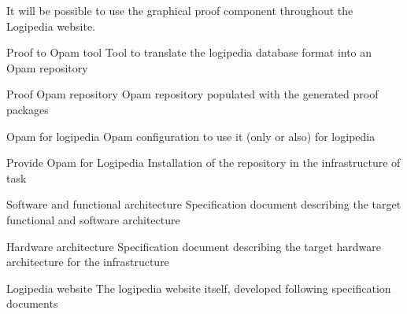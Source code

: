\begin{workpackage}[id=access,wphases=0-48,type=MGT,
  short=Access,%
  title={Access to the infrastructure},
  lead=Irt,IrtRM=23,OcaRM=6,EduRM=12,InrRM=18]
\begin{tasklist}
\begin{task}[id=edukera,
      title=Web interface for doing proofs at school,
      lead=Edu,EduRM=12]
      It will be possible to use the graphical proof component throughout
      the Logipedia website.

  \end{task}

\end{tasklist}

\begin{wpdelivs}
  \begin{wpdeliv}[due=2,miles=???,id=opamtool,dissem=PU,nature=DEM,lead=Oca]{Proof to Opam tool}
    Tool to translate the logipedia database format into an Opam repository
  \end{wpdeliv}

  \begin{wpdeliv}[due=2,miles=???,id=opamrepo,dissem=PU,nature=DEM,lead=Oca]{Proof Opam repository}
    Opam repository populated with the generated proof packages
  \end{wpdeliv}

  \begin{wpdeliv}[due=1,miles=???,id=opamconfig,dissem=PU,nature=DEM,lead=Oca]{Opam for logipedia}
    Opam configuration to use it (only or also) for logipedia
  \end{wpdeliv}

  \begin{wpdeliv}[due=1,miles=???,id=opaminstall,dissem=PU,nature=DEM,lead=Oca]{Provide Opam for Logipedia}
    Installation of the repository in the infrastructure of task 
  \end{wpdeliv}

  \begin{wpdeliv}[due=18,miles=???,id=archi-spec,dissem=PU,nature=R,lead=Irt]{Software and functional architecture}
    Specification document describing the target functional and software architecture
  \end{wpdeliv}

  \begin{wpdeliv}[due=20,miles=???,id=infra-spec,dissem=PU,nature=R,lead=Irt]{Hardware architecture}
    Specification document describing the target hardware architecture for the infrastructure
  \end{wpdeliv}

  \begin{wpdeliv}[due=48,miles=???,id=website,dissem=PU,nature=D,lead=Irt]{Logipedia website}
    The logipedia website itself, developed following specification documents
  \end{wpdeliv}


\end{wpdelivs}
\end{workpackage}
